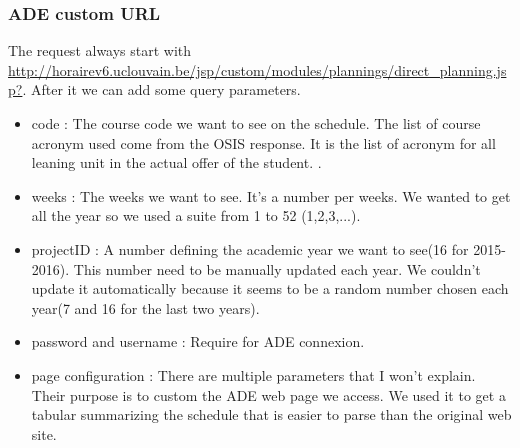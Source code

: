 \documentclass{eplmastersthesis}
\begin{document}
\subsubsection{ADE custom URL}
The request always start with \url{http://horairev6.uclouvain.be/jsp/custom/modules/plannings/direct_planning.jsp?}. After it we can add some query parameters.
\begin{itemize}
\item code : The course code we want to see on the schedule. The list of course acronym used come from the OSIS response. It is the list of acronym for all leaning unit in the actual offer of the student. .
\item weeks : The weeks we want to see. It's a number per weeks. We wanted to get all the year so we used a suite from 1 to 52 (1,2,3,...).
\item projectID : A number defining the academic year we want to see(16 for 2015-2016). This number need to be manually updated each year. We couldn't update it automatically because it seems to be a random number chosen each year(7 and 16 for the last two years).
\item password and username : Require for ADE connexion.
\item page configuration : There are multiple parameters that I won't explain. Their purpose is to custom the ADE web page we access. We used it to get a tabular summarizing the schedule that is easier to parse than the original web site. 
\end{itemize}
\end{document}

